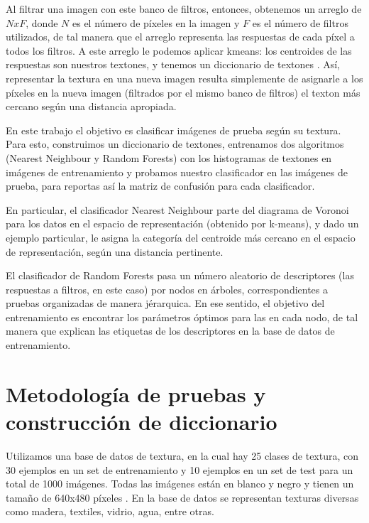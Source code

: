 \documentclass[10pt,twocolumn,letterpaper]{article}
\begin{document}
Al filtrar una imagen con este banco de filtros, entonces, obtenemos un arreglo de $NxF$, donde $N$ es el número de píxeles en la imagen y $F$ es el número de filtros utilizados, de tal manera que el arreglo representa las respuestas de cada píxel a todos los filtros. A este arreglo le podemos aplicar kmeans: los centroides de las respuestas son nuestros textones, y tenemos un diccionario de textones \cite{3_malik_belongie_leung_shi_2001}. Así, representar la textura en una nueva imagen resulta simplemente de asignarle a los píxeles en la nueva imagen (filtrados por el mismo banco de filtros) el texton más cercano según una distancia apropiada\cite{forsyth}. 

En este trabajo el objetivo es clasificar imágenes de prueba según su textura. Para esto, construimos un diccionario de textones, entrenamos dos algoritmos (Nearest Neighbour y Random Forests) con los histogramas de textones en imágenes de entrenamiento y probamos nuestro clasificador en las imágenes de prueba, para reportas así la matriz de confusión para cada clasificador.

En particular, el clasificador Nearest Neighbour parte del diagrama de Voronoi para los datos en el espacio de representación (obtenido por k-means), y dado un ejemplo particular, le asigna la categoría del centroide más cercano en el espacio de representación, según una distancia pertinente. 

El clasificador de Random Forests pasa un número aleatorio de descriptores (las respuestas a filtros, en este caso) por nodos en árboles, correspondientes a pruebas organizadas de manera jérarquica. En ese sentido, el objetivo del entrenamiento es encontrar los parámetros óptimos para las  en cada nodo, de tal manera que explican las etiquetas de los descriptores \cite{criminisi} en la base de datos de entrenamiento. 


\section{Metodología de pruebas y construcción de diccionario}

Utilizamos una base de datos de textura, en la cual hay 25 clases de textura, con 30 ejemplos en un set de entrenamiento y 10 ejemplos en un set de test para un total de 1000 imágenes. Todas las imágenes están en blanco y negro y tienen un tamaño de 640x480 píxeles \cite{ponce}. En la base de datos se representan texturas diversas como madera, textiles, vidrio, agua, entre otras.
\end{document}
